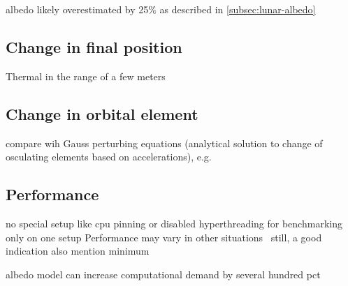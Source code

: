 albedo likely overestimated by 25\% as described in \cref{subsec:lunar-albedo}



\subsection{Change in final position}

Thermal in the range of a few meters ~\cite{Mazarico2011}


\subsection{Change in orbital element}

compare wih Gauss perturbing equations (analytical solution to change of osculating elements based on accelerations), e.g. ~\cite[Sec.~3.2]{Lucchesi2006}




\subsection{Performance}
no special setup like cpu pinning or disabled hyperthreading for benchmarking
only on one setup
Performance may vary in other situations~\cite{Mytkowicz2009}
still, a good indication
also mention minimum

albedo model can increase computational demand by several hundred pct \cite{Nicholson2010}

